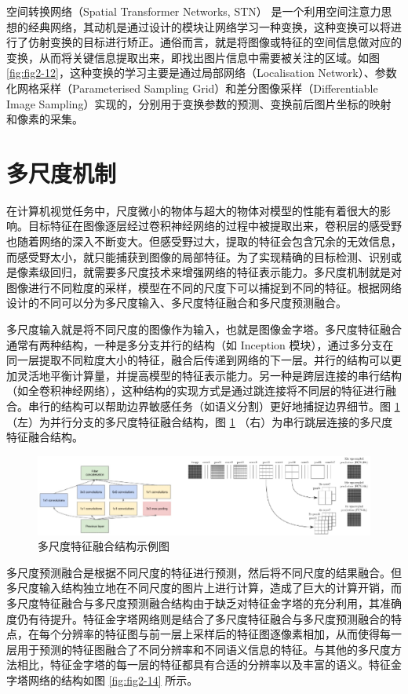 空间转换网络（Spatial Transformer Networks, STN）\cite{DBLP:conf/nips/JaderbergSZK15} 是一个利用空间注意力思想的经典网络，其动机是通过设计的模块让网络学习一种变换，这种变换可以将进行了仿射变换的目标进行矫正。通俗而言，就是将图像或特征的空间信息做对应的变换，从而将关键信息提取出来，即找出图片信息中需要被关注的区域。如图 \ref{fig:fig2-12}，这种变换的学习主要是通过局部网络（Localisation Network）、参数化网格采样（Parameterised Sampling Grid）和差分图像采样（Differentiable Image Sampling）实现的，分别用于变换参数的预测、变换前后图片坐标的映射和像素的采集。

\section{多尺度机制}

在计算机视觉任务中，尺度微小的物体与超大的物体对模型的性能有着很大的影响。目标特征在图像逐层经过卷积神经网络的过程中被提取出来，卷积层的感受野也随着网络的深入不断变大。但感受野过大，提取的特征会包含冗余的无效信息，而感受野太小，就只能捕获到图像的局部特征。为了实现精确的目标检测、识别或是像素级回归，就需要多尺度技术来增强网络的特征表示能力。多尺度机制就是对图像进行不同粒度的采样，模型在不同的尺度下可以捕捉到不同的特征。根据网络设计的不同可以分为多尺度输入、多尺度特征融合和多尺度预测融合。

多尺度输入就是将不同尺度的图像作为输入，也就是图像金字塔。多尺度特征融合通常有两种结构，一种是多分支并行的结构（如 Inception 模块），通过多分支在同一层提取不同粒度大小的特征，融合后传递到网络的下一层。并行的结构可以更加灵活地平衡计算量，并提高模型的特征表示能力。另一种是跨层连接的串行结构（如全卷积神经网络），这种结构的实现方式是通过跳连接将不同层的特征进行融合。串行的结构可以帮助边界敏感任务（如语义分割）更好地捕捉边界细节。图 \ref{fig:fig2-13} （左）为并行分支的多尺度特征融合结构，图 \ref{fig:fig2-13} （右）为串行跳层连接的多尺度特征融合结构。

\begin{figure}[!htbp]
	\centering
	\includegraphics{figures/14.png}
	\caption{多尺度特征融合结构示例图}
	\label{fig:fig2-13}
\end{figure}

多尺度预测融合是根据不同尺度的特征进行预测，然后将不同尺度的结果融合。但多尺度输入结构独立地在不同尺度的图片上进行计算，造成了巨大的计算开销，而多尺度特征融合与多尺度预测融合结构由于缺乏对特征金字塔的充分利用，其准确度仍有待提升。特征金字塔网络则是结合了多尺度特征融合与多尺度预测融合的特点，在每个分辨率的特征图与前一层上采样后的特征图逐像素相加，从而使得每一层用于预测的特征图融合了不同分辨率和不同语义信息的特征。与其他的多尺度方法相比，特征金字塔的每一层的特征都具有合适的分辨率以及丰富的语义。特征金字塔网络的结构如图 \ref{fig:fig2-14} 所示。

